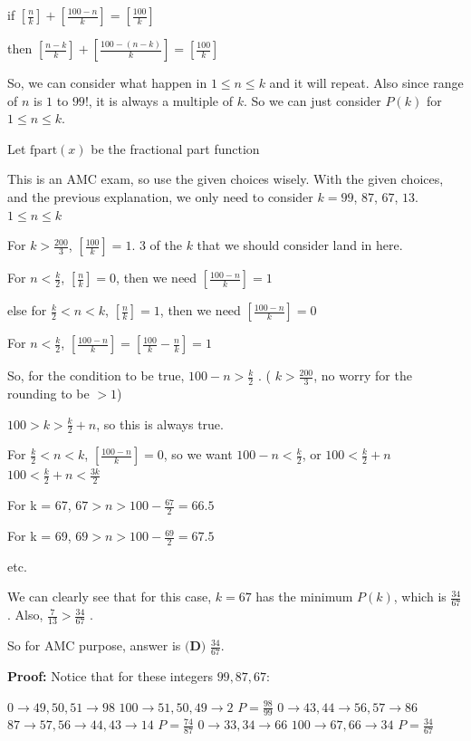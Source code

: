 \begin{enumerate}
 if $\left[\frac{n}{k}\right] + \left[\frac{100 - n}{k}\right] = \left[\frac{100}{k}\right]$

 then $\left[\frac{n - k}{k}\right] + \left[\frac{100 - (n - k)}{k}\right] = \left[\frac{100}{k}\right]$

 So, we can consider what happen in $1\le n \le k$ and it will repeat. Also since range of $n$ is $1$ to $99!$, it is always a multiple of $k$. So we can just consider $P(k)$ for $1\le n \le k$.

 
Let $\text{fpart}(x)$ be the fractional part function

 This is an AMC exam, so use the given choices wisely. With the given choices, and the previous explanation, we only need to consider $k = 99$, $87$, $67$, $13$. $1\le n \le k$

 
For $k > \frac{200}{3}$, $\left[\frac{100}{k}\right] = 1$. 3 of the $k$ that we should consider land in here.

 For $n < \frac{k}{2}$, $\left[\frac{n}{k}\right] = 0$, then we need $\left[\frac{100 - n}{k}\right] = 1$

 else for $\frac{k}{2}< n < k$, $\left[\frac{n}{k}\right] = 1$, then we need $\left[\frac{100 - n}{k}\right] = 0$


 For $n < \frac{k}{2}$, $\left[\frac{100 - n}{k}\right] = \left[\frac{100}{k} - \frac{n}{k}\right]= 1$

 So, for the condition to be true, $100 - n > \frac{k}{2}$ .  ( $k > \frac{200}{3}$, no worry for the rounding to be $> 1$)

 $100 > k > \frac{k}{2} + n$, so this is always true.

 For $\frac{k}{2}< n < k$, $\left[\frac{100 - n}{k}\right] = 0$, so we want $100 - n < \frac{k}{2}$, or $100 < \frac{k}{2} + n$
$100 <\frac{k}{2} + n <  \frac{3k}{2}$

 For k = 67, $67 > n > 100 - \frac{67}{2} = 66.5$

 For k = 69, $69 > n > 100 - \frac{69}{2} = 67.5$

 etc.

 
We can clearly see that for this case, $k = 67$ has the minimum $P(k)$, which is $\frac{34}{67}$. Also, $\frac{7}{13} > \frac{34}{67}$ .

 So for AMC purpose, answer is $\boxed{\textbf{(D) }\frac{34}{67}}$.

 \textbf{Proof:} Notice that for these integers $99,87,67$:

 
$0\rightarrow 49,50,51\rightarrow 98$
$100\rightarrow 51,50,49\rightarrow 2$
$P=\frac{98}{99}$
$0\rightarrow 43,44\rightarrow 56,57\rightarrow 86$
$87\rightarrow 57,56\rightarrow 44,43\rightarrow 14$
$P=\frac{74}{87}$
$0\rightarrow 33,34\rightarrow 66$
$100\rightarrow 67,66\rightarrow 34$
$P=\frac{34}{67}$


\end{enumerate}
